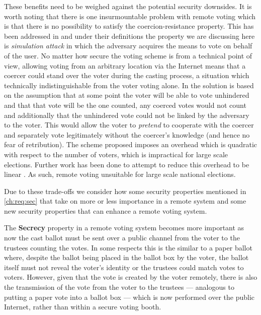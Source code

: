 These benefits need to be weighed against the potential security downsides. It is worth noting that there is one insurmountable problem with remote voting which is that there is no possibility to satisfy the coercion-resistance property. This has been addressed in \cite{juelsCoercionResistantElectronicElections2002} and under their definitions the property we are discussing here is \emph{simulation attack} in which the adversary acquires the means to vote on behalf of the user. No matter how secure the voting scheme is from a technical point of view, allowing voting from an arbitrary location via the Internet means that a coercer could stand over the voter during the casting process, a situation which technically indistinguishable from the voter voting alone. In \cite{juelsCoercionResistantElectronicElections2002} the solution is based on the assumption that at some point the voter will be able to vote unhindered and that that vote will be the one counted, any coerced votes would not count and additionally that the unhindered vote could not be linked by the adversary to the voter. This would allow the voter to \emph{pretend} to cooperate with the coercer and separately vote legitimately without the coercer's knowledge (and hence no fear of retribution). The scheme proposed imposes an overhead which is quadratic with respect to the number of voters, which is impractical for large scale elections. Further work has been done to attempt to reduce this overhead to be linear . As such, remote voting unsuitable for large scale national elections.

Due to these trade-offs we consider how some security properties mentioned in \autoref{ch:req:sec} that take on more or less importance in a remote system and some new security properties that can enhance a remote voting system.

The \textbf{Secrecy} property in a remote voting system becomes more important as now the cast ballot must be sent over a public channel from the voter to the trustees counting the votes. In some respects this is the similar to a paper ballot where, despite the ballot being placed in the ballot box by the voter, the ballot itself must not reveal the voter's identity or the trustees could match votes to voters. However, given that the vote is created by the voter remotely, there is also the transmission of the vote from the voter to the trustees --- analogous to putting a paper vote into a ballot box --- which is now performed over the public Internet, rather than within a secure voting booth.

